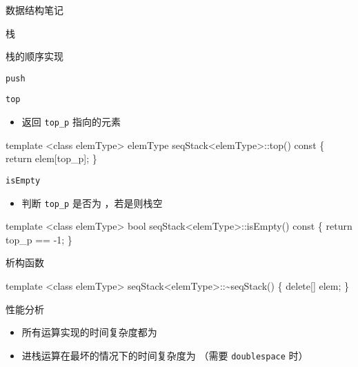 \documentclass[
  ignorenonframetext,
]{beamer}
\newenvironment{Shaded}{}{}
\newcommand{\NormalTok}[1]{#1}
\providecommand{\tightlist}{%
  \setlength{\itemsep}{0pt}\setlength{\parskip}{0pt}}
\begin{document}
\begin{frame}[fragile]{数据结构笔记}
\begin{block}{栈}
\begin{block}{栈的顺序实现}
\begin{block}{\texttt{push}}
\begin{block}{\texttt{top}}
\protect{}\label{top}
\begin{itemize}
\tightlist
\item
  返回 \texttt{top\_p} 指向的元素
\end{itemize}

\begin{Shaded}
\begin{Highlighting}[]
\NormalTok{template \textless{}class elemType\textgreater{}}
\NormalTok{elemType seqStack\textless{}elemType\textgreater{}::top() const}
\NormalTok{\{}
\NormalTok{  return elem[top\_p];}
\NormalTok{\}}
\end{Highlighting}
\end{Shaded}
\end{block}

\begin{block}{\texttt{isEmpty}}
\protect{}\label{isempty}
\begin{itemize}
\tightlist
\item
  判断 \texttt{top\_p} 是否为 {}，若是则栈空
\end{itemize}

\begin{Shaded}
\begin{Highlighting}[]
\NormalTok{template \textless{}class elemType\textgreater{}}
\NormalTok{bool seqStack\textless{}elemType\textgreater{}::isEmpty() const}
\NormalTok{\{}
\NormalTok{  return top\_p == {-}1;}
\NormalTok{\}}
\end{Highlighting}
\end{Shaded}
\end{block}
\end{block}

\begin{block}{析构函数}
\protect{}\label{ux6790ux6784ux51fdux6570-1}
\begin{Shaded}
\begin{Highlighting}[]
\NormalTok{template \textless{}class elemType\textgreater{}}
\NormalTok{seqStack\textless{}elemType\textgreater{}::\textasciitilde{}seqStack()}
\NormalTok{\{}
\NormalTok{  delete[] elem;}
\NormalTok{\}}
\end{Highlighting}
\end{Shaded}
\end{block}

\begin{block}{性能分析}
\protect{}\label{ux6027ux80fdux5206ux6790}
\begin{itemize}
\tightlist
\item
  所有运算实现的时间复杂度都为 {}
\item
  进栈运算在最坏的情况下的时间复杂度为 {} （需要 \texttt{doublespace}
  时）
\end{itemize}
\end{block}
\end{block}


\end{block}
\end{frame}
\end{document}
